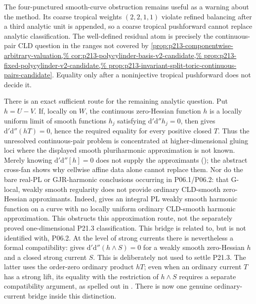 The four-punctured smooth-curve obstruction remains useful as a warning about
the method.  Its coarse tropical weights \((2,2,1,1)\) violate refined
balancing after a third analytic unit is appended, so a coarse tropical
pushforward cannot replace analytic classification.  The well-defined
residual atom is precisely the continuous-pair CLD question in the ranges
not covered by
\cref{prop:p213-componentwise-arbitrary-valuation,%
cor:p213-polycylinder-basis-v2-candidate,%
prop:p213-fixed-polycylinder-v2-candidate,%
prop:p213-invariant-split-toric-continuous-pairs-candidate}.  Equality only after a
noninjective tropical pushforward does not decide it.

There is an exact sufficient route for the remaining analytic question.  Put
\(h=U-V\).  If, locally on \(W\), the continuous zero-Hessian function
\(h\) is a locally uniform limit of smooth functions \(h_j\) satisfying
\(\mathrm d'\mathrm d''h_j=0\), then
 gives
\(\mathrm d'\mathrm d''(hT)=0\), hence the required equality for every
positive closed \(T\).  Thus the unresolved continuous-pair problem is
concentrated at higher-dimensional gluing loci where the displayed smooth
pluriharmonic approximation is not known.  Merely knowing
\(\mathrm d'\mathrm d''[h]=0\) does not supply the approximants
(); the abstract cross-fan shows why
cellwise affine data alone cannot replace them.  Nor do the bare real-PL or
GJR-harmonic conclusions occurring in P06.1/P06.2: that G-local,
weakly smooth regularity does not provide ordinary CLD-smooth zero-Hessian
approximants.  Indeed,
 gives an integral PL
weakly smooth harmonic function on a curve with no locally uniform ordinary
CLD-smooth harmonic approximation.  This obstructs this approximation route,
not the separately proved one-dimensional P21.3 classification.  This bridge
is related to, but is not identified with, P06.2.
At the level of strong currents there is nevertheless a formal compatibility:
 gives
\(\mathrm d'\mathrm d''(h\wedge S)=0\) for a weakly smooth zero-Hessian
\(h\) and a closed strong current \(S\).  This is deliberately not used to
settle P21.3.  The latter uses the order-zero ordinary product \(hT\); even
when an ordinary current \(T\) has a strong lift, its equality with the
restriction of \(h\wedge S\) requires a separate compatibility argument, as
spelled out in .
There is now one genuine ordinary-current bridge inside this distinction.
